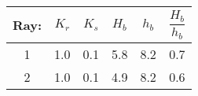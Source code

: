 \begin{tabular}{cccccc}
Ray: & $K_{r}$ & $K_{s}$ & $H_{b}$ & $h_{b}$ & $\dfrac{H_{b}}{h_{b}}$ \\
\hline
1 & 1.0 & 0.1 & 5.8 & 8.2 & 0.7 \\
2 & 1.0 & 0.1 & 4.9 & 8.2 & 0.6 \\
\hline
\end{tabular}
